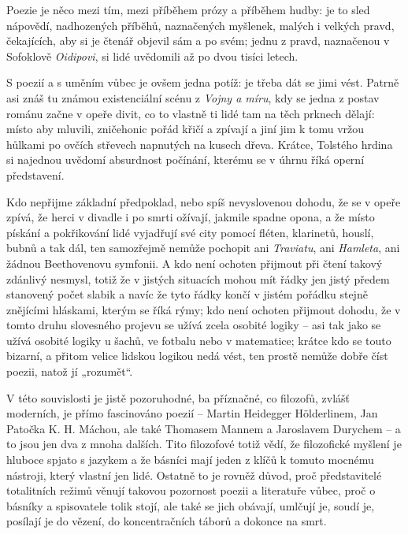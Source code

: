 Poezie je něco mezi tím, mezi příběhem prózy a příběhem hudby: je to sled nápovědí, nadhozených příběhů, naznačených myšle­nek, malých i velkých pravd, čekajících, aby si je čtenář objevil sám a po svém; jednu z pravd, naznačenou v Sofoklově \textit{Oidipovi}, si lidé uvědomili až po dvou tisíci letech.

S poezií a s uměním vůbec je ovšem jedna potíž: je třeba dát se jimi vést. Patrně asi znáš tu známou existenciální scénu z \textit{Vojny a míru}, kdy se jedna z postav románu začne v opeře divit, co to vlastně ti lidé tam na těch prknech dělají: místo aby mlu­vili, zničehonic pořád křičí a zpívají a jiní jim k tomu vržou hůlkami po ovčích střevech napnutých na kusech dřeva. Krátce, Tolstého hrdina si najednou uvědomí absurdnost počínání, kterému se v úhrnu říká operní představení.

Kdo nepřijme základní předpoklad, nebo spíš nevyslovenou dohodu, že se v opeře zpívá, že herci v divadle i po smrti ožívají, jakmile spadne opona, a že místo pískání a pokřikování lidé vyjadřují své city pomocí fléten, klarinetů, houslí, bubnů a tak dál, ten samozřejmě nemůže pochopit ani \textit{Traviatu}, ani \textit{Hamleta}, ani žádnou Beethovenovu symfonii. A kdo není ochoten přijmout při čtení takový zdánlivý nesmysl, totiž že v jistých situacích mohou mít řádky jen jistý předem stanovený počet slabik a navíc že tyto řádky končí v jistém pořádku stejně znějícími hláskami, kterým se říká rýmy; kdo není ochoten přijmout dohodu, že v tomto druhu slovesného projevu se užívá zcela osobité logiky – asi tak jako se užívá osobité logiky u šachů, ve fotbalu nebo v matematice; krátce kdo se touto bizarní, a přitom velice lidskou logikou nedá vést, ten prostě nemůže dobře číst poezii, natož jí „rozumět“.

V této souvislosti je jistě pozoruhodné, ba příznačné, co filozofů, zvlášť moderních, je přímo fascinováno poezií – Martin Heidegger Hölderlinem, Jan Patočka K. H. Máchou, ale také Thomasem Mannem a Jaroslavem Durychem – a to jsou jen dva z mnoha dalších. Tito filozofové totiž vědí, že filozofické myšlení je hluboce spjato s jazykem a že básníci mají jeden z klíčů k tomuto mocnému nástroji, který vlastní jen lidé. Ostatně to je rovněž důvod, proč představitelé totalitních režimů věnují takovou pozornost poezii a literatuře vůbec, proč o básníky a spisovatele tolik stojí, ale také se jich obávají, umlčují je, soudí je, posílají je do vězení, do koncentračních táborů a dokonce na smrt.

